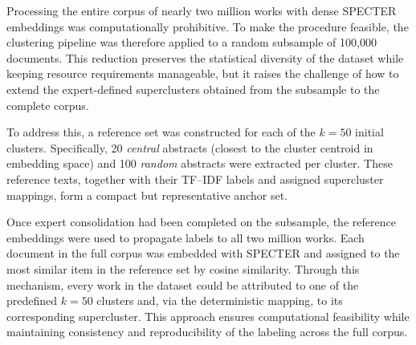 \documentclass{article}
\begin{document}
Processing the entire corpus of nearly two million works with dense SPECTER embeddings was computationally prohibitive. To make the procedure feasible, the clustering pipeline was therefore applied to a random subsample of 100,000 documents. This reduction preserves the statistical diversity of the dataset while keeping resource requirements manageable, but it raises the challenge of how to extend the expert-defined superclusters obtained from the subsample to the complete corpus.  

To address this, a reference set was constructed for each of the $k=50$ initial clusters. Specifically, 20 \emph{central} abstracts (closest to the cluster centroid in embedding space) and 100 \emph{random} abstracts were extracted per cluster. These reference texts, together with their TF–IDF labels and assigned supercluster mappings, form a compact but representative anchor set.  

Once expert consolidation had been completed on the subsample, the reference embeddings were used to propagate labels to all two million works. Each document in the full corpus was embedded with SPECTER and assigned to the most similar item in the reference set by cosine similarity. Through this mechanism, every work in the dataset could be attributed to one of the predefined $k=50$ clusters and, via the deterministic mapping, to its corresponding supercluster. This approach ensures computational feasibility while maintaining consistency and reproducibility of the labeling across the full corpus.


\end{document}
